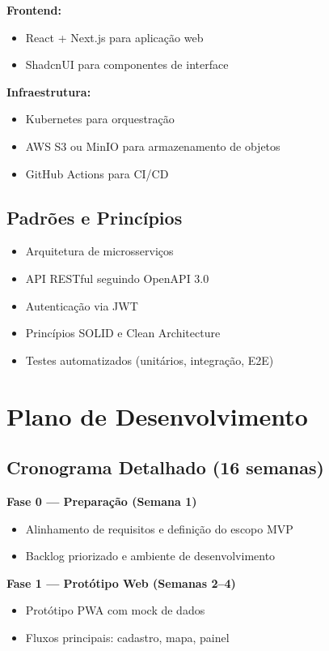 \documentclass[12pt,a4paper]{article}
\begin{document}
\textbf{Frontend:}
\begin{itemize}
    \item React + Next.js para aplicação web
    \item ShadcnUI para componentes de interface
\end{itemize}

\textbf{Infraestrutura:}
\begin{itemize}
    \item Kubernetes para orquestração
    \item AWS S3 ou MinIO para armazenamento de objetos
    \item GitHub Actions para CI/CD
\end{itemize}

\subsection{Padrões e Princípios}

\begin{itemize}
    \item Arquitetura de microsserviços
    \item API RESTful seguindo OpenAPI 3.0
    \item Autenticação via JWT
    \item Princípios SOLID e Clean Architecture
    \item Testes automatizados (unitários, integração, E2E)
\end{itemize}

\section{Plano de Desenvolvimento}
\label{sec:desenvolvimento}

\subsection{Cronograma Detalhado (16 semanas)}

\textbf{Fase 0 — Preparação (Semana 1)}
\begin{itemize}
    \item Alinhamento de requisitos e definição do escopo MVP
    \item Backlog priorizado e ambiente de desenvolvimento
\end{itemize}

\textbf{Fase 1 — Protótipo Web (Semanas 2–4)}
\begin{itemize}
    \item Protótipo PWA com mock de dados
    \item Fluxos principais: cadastro, mapa, painel
\end{itemize}
\end{document}
